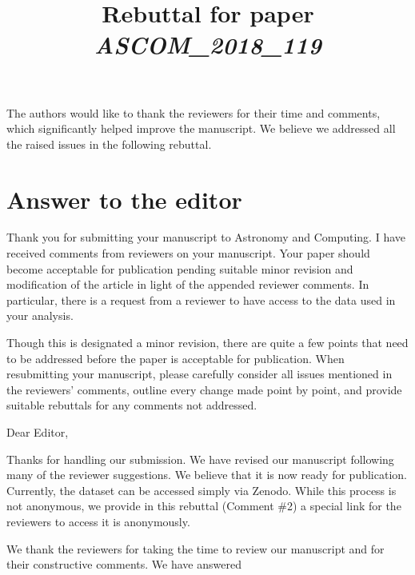 \documentclass[12pt,a4paper]{article}
\title{\vspace{-1cm}
\begin{flushleft} {\sffamily Rebuttal for paper \emph{ASCOM\_2018\_119} }\end{flushleft}}
\date{\vspace{-1.7cm}\begin{flushleft}\sffamily DeepSphere: Efficient spherical Convolutional Neural Network with HEALPix sampling for cosmological applications, Nathanaël Perraudin, Michaël Defferrard, Tomasz Kacprzak, Raphael Sgier \end{flushleft}}
\newcommand{\1}{\b{1}}              %
\newcommand{\0}{\b{0}}              %
\begin{document}
\maketitle


The authors would like to thank the reviewers for their time and comments, which significantly helped improve the manuscript.
We believe we addressed all the raised issues in the following rebuttal.

\section*{Answer to the editor}


\begin{mdframed}[style=comment]
Thank you for submitting your manuscript to Astronomy and Computing. I have received comments from reviewers on your manuscript. Your paper should become acceptable for publication pending suitable minor revision and modification of the article in light of the appended reviewer comments.  In particular, there is a request from a reviewer to have access to the data used in your analysis.

Though this is designated a minor revision, there are quite a few points that need to be addressed before the paper is acceptable for publication.  When resubmitting your manuscript, please carefully consider all issues mentioned in the reviewers' comments, outline every change made point by point, and provide suitable rebuttals for any comments not addressed.
\end{mdframed}

Dear Editor,

Thanks for handling our submission. We have revised our manuscript following many of the reviewer suggestions. We believe that it is now ready for publication. Currently, the dataset can be accessed simply via Zenodo. While this process is not anonymous, we provide in this rebuttal (Comment \#2) a special link for the reviewers to access it is anonymously.

We thank the reviewers for taking the time to review our manuscript and for their constructive comments. We have answered


\newpage

\section{}
\end{document}
